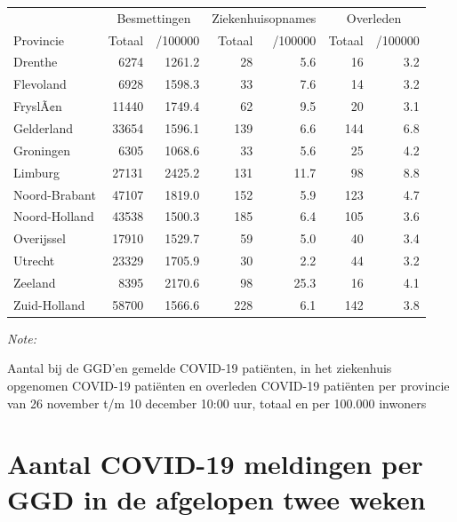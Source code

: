 \documentclass[
  english,
  man,floatsintext]{apa6}
\begin{document}
\begin{table}
\centering
\begin{threeparttable}
\begin{tabular}{lrrrrrr}
\toprule
\multicolumn{1}{c}{ } & \multicolumn{2}{c}{Besmettingen} & \multicolumn{2}{c}{Ziekenhuisopnames} & \multicolumn{2}{c}{Overleden} \\
\cmidrule(l{3pt}r{3pt}){2-3} \cmidrule(l{3pt}r{3pt}){4-5} \cmidrule(l{3pt}r{3pt}){6-7}
Provincie & Totaal & /100000 & Totaal & /100000 & Totaal & /100000\\
\midrule
Drenthe & 6274 & 1261.2 & 28 & 5.6 & 16 & 3.2\\
Flevoland & 6928 & 1598.3 & 33 & 7.6 & 14 & 3.2\\
FryslÃ¢n & 11440 & 1749.4 & 62 & 9.5 & 20 & 3.1\\
Gelderland & 33654 & 1596.1 & 139 & 6.6 & 144 & 6.8\\
Groningen & 6305 & 1068.6 & 33 & 5.6 & 25 & 4.2\\
Limburg & 27131 & 2425.2 & 131 & 11.7 & 98 & 8.8\\
Noord-Brabant & 47107 & 1819.0 & 152 & 5.9 & 123 & 4.7\\
Noord-Holland & 43538 & 1500.3 & 185 & 6.4 & 105 & 3.6\\
Overijssel & 17910 & 1529.7 & 59 & 5.0 & 40 & 3.4\\
Utrecht & 23329 & 1705.9 & 30 & 2.2 & 44 & 3.2\\
Zeeland & 8395 & 2170.6 & 98 & 25.3 & 16 & 4.1\\
Zuid-Holland & 58700 & 1566.6 & 228 & 6.1 & 142 & 3.8\\
\bottomrule
\end{tabular}
\begin{tablenotes}
\item \textit{Note: } 
\item Aantal bij de GGD’en gemelde COVID-19 patiënten, in het ziekenhuis opgenomen COVID-19 patiënten en overleden COVID-19 patiënten per provincie van 26 november t/m 10 december 10:00 uur, totaal en per 100.000 inwoners
\end{tablenotes}
\end{threeparttable}
\end{table}

\newpage

\hypertarget{aantal-covid-19-meldingen-per-ggd-in-de-afgelopen-twee-weken}{%
\section{Aantal COVID-19 meldingen per GGD in de afgelopen twee weken}\label{aantal-covid-19-meldingen-per-ggd-in-de-afgelopen-twee-weken}}
\end{document}
